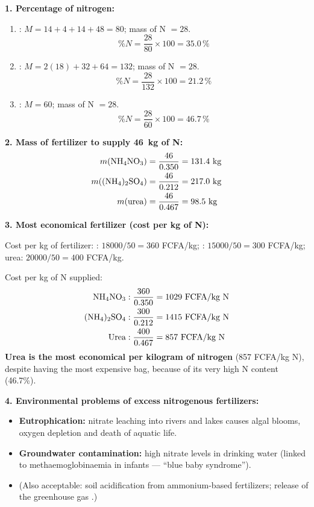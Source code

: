 \documentclass[11pt]{article}
\begin{document}
\begin{corrige}
\textbf{1. Percentage of nitrogen:}
\begin{enumerate}
\item[(a)] : $M = 14+4+14+48 = 80$; mass of N $= 28$.
\[ \%N = \frac{28}{80}\times 100 = 35.0\,\% \]
\item[(b)] : $M = 2(18) + 32 + 64 = 132$; mass of N $= 28$.
\[ \%N = \frac{28}{132}\times 100 = 21.2\,\% \]
\item[(c)] : $M = 60$; mass of N $= 28$.
\[ \%N = \frac{28}{60}\times 100 = 46.7\,\% \]
\end{enumerate}

\textbf{2. Mass of fertilizer to supply \SI{46}{\kilo\gram} of N:}
\begin{align*}
m(\ce{NH4NO3}) &= \frac{46}{0.350} = 131.4\ \mathrm{kg}\\
m(\ce{(NH4)2SO4}) &= \frac{46}{0.212} = 217.0\ \mathrm{kg}\\
m(\text{urea}) &= \frac{46}{0.467} = 98.5\ \mathrm{kg}
\end{align*}

\textbf{3. Most economical fertilizer (cost per kg of N):}

Cost per kg of fertilizer: : $18000/50 = 360$ FCFA/kg; : $15000/50 = 300$ FCFA/kg; urea: $20000/50 = 400$ FCFA/kg.

Cost per kg of N supplied:
\begin{align*}
\ce{NH4NO3}&: \frac{360}{0.350} = 1029\ \text{FCFA/kg N}\\
\ce{(NH4)2SO4}&: \frac{300}{0.212} = 1415\ \text{FCFA/kg N}\\
\text{Urea}&: \frac{400}{0.467} = 857\ \text{FCFA/kg N}
\end{align*}
\textbf{Urea is the most economical per kilogram of nitrogen} (857 FCFA/kg N), despite having the most expensive bag, because of its very high N content (46.7\%).

\textbf{4. Environmental problems of excess nitrogenous fertilizers:}
\begin{itemize}
\item \textbf{Eutrophication:} nitrate leaching into rivers and lakes causes algal blooms, oxygen depletion and death of aquatic life.
\item \textbf{Groundwater contamination:} high nitrate levels in drinking water (linked to methaemoglobinaemia in infants --- ``blue baby syndrome'').
\item (Also acceptable: soil acidification from ammonium-based fertilizers; release of the greenhouse gas .)
\end{itemize}
\end{corrige}
\end{document}
